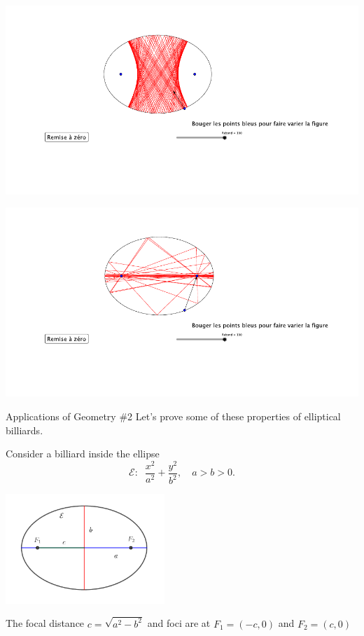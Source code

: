 \documentclass[compress,aspectratio=169,10pt,usenames,dvipsnames]{beamer}
\begin{document}
\begin{frame}
\centering
\includegraphics[scale=2.0]{EllBillHyp}
\end{frame}


\begin{frame}
\centering
\includegraphics[scale=2.0]{EllBillFoc}
\end{frame}


\begin{frame}

\begin{block}{Applications of Geometry \#2}
Let's prove some of these properties of elliptical billiards. 
\end{block}

Consider a billiard inside the ellipse
$$
\mathcal{E}:\;\;\frac{x^2}{a^2}+\frac{y^2}{b^2}, \quad a > b >0.
$$

\begin{center}
\includegraphics[width=0.45\textwidth]{Ellipse}
\end{center}

The focal distance $c = \sqrt{a^2-b^2}$ and foci are at $F_1 = (-c,0)$ and $F_2 = (c,0)$

\end{frame}
\end{document}
